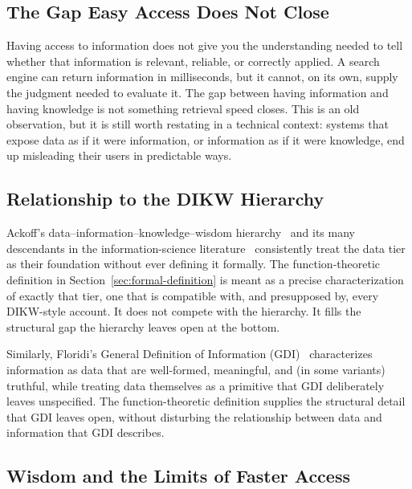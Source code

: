 \subsection{The Gap Easy Access Does Not Close}

Having access to information does not give you the understanding needed to
tell whether that information is relevant, reliable, or correctly applied. A
search engine can return information in milliseconds, but it cannot, on its
own, supply the judgment needed to evaluate it. The gap between having
information and having knowledge is not something retrieval speed closes.
This is an old observation, but it is still worth restating in a technical
context: systems that expose data as if it were information, or information
as if it were knowledge, end up misleading their users in predictable ways.
\newpage
\subsection{Relationship to the DIKW Hierarchy}

Ackoff's data--information--knowledge--wisdom hierarchy~\autocite{ackoff1989}
and its many descendants in the information-science
literature~\autocite{rowley2007,zins2007} consistently treat the data tier as
their foundation without ever defining it formally. The function-theoretic
definition in Section~\ref{sec:formal-definition} is meant as a precise
characterization of exactly that tier, one that is compatible with, and
presupposed by, every DIKW-style account. It does not compete with the
hierarchy. It fills the structural gap the hierarchy leaves open at the
bottom.

Similarly, Floridi's General Definition of Information
(GDI)~\autocite{floridi2010} characterizes information as data that are
well-formed, meaningful, and (in some variants) truthful, while treating data
themselves as a primitive that GDI deliberately leaves unspecified. The
function-theoretic definition supplies the structural detail that GDI leaves
open, without disturbing the relationship between data and information that
GDI describes.

\subsection{Wisdom and the Limits of Faster Access}

